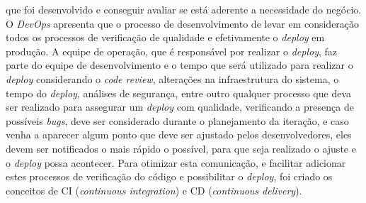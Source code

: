       que foi desenvolvido e conseguir avaliar se está aderente a necessidade do
      negócio. \newline
      O \textit{DevOps} apresenta que o processo de desenvolvimento de levar em
      consideração todos os processos de verificação de qualidade e efetivamente
      o \textit{deploy} em produção. A equipe de operação, que é responsável por
      realizar o \textit{deploy}, faz parte do equipe de desenvolvimento e o tempo
      que será utilizado para realizar o \textit{deploy} considerando o
      \textit{code review}, alterações na infraestrutura do sistema, o tempo do
      \textit{deploy}, análises de segurança, entre outro qualquer processo que
      deva ser realizado para assegurar um \textit{deploy} com qualidade, verificando
      a presença de possíveis \textit{bugs}, deve ser considerado durante o
      planejamento da iteração, e caso venha a aparecer algum ponto que deve ser
      ajustado pelos desenvolvedores, eles devem ser notificados o mais rápido o
      possível, para que seja realizado o ajuste e o \textit{deploy} possa acontecer. \newline
      Para otimizar esta comunicação, e facilitar adicionar estes processos de
      verificação do código e possibilitar o \textit{deploy}, foi criado os
      conceitos de CI (\textit{continuous integration}) e CD
      (\textit{continuous delivery}).

